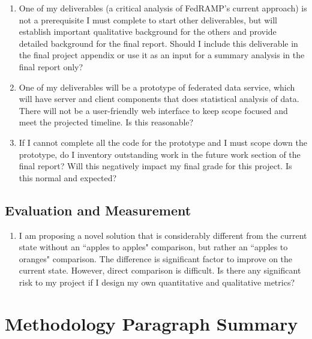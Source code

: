 \documentclass{jdf}
\begin{document}
\begin{enumerate}
    \item One of my deliverables (a critical analysis of FedRAMP's current approach) is not a prerequisite I must complete to start other deliverables, but will establish important qualitative background for the others and provide detailed background for the final report. Should I include this deliverable in the final project appendix or use it as an input for a summary analysis in the final report only?
    \item One of my deliverables will be a prototype of federated data service, which will have server and client components that does statistical analysis of data. There will not be a user-friendly web interface to keep scope focused and meet the projected timeline. Is this reasonable?
    \item If I cannot complete all the code for the prototype and I must scope down the prototype, do I inventory outstanding work in the future work section of the final report? Will this negatively impact my final grade for this project. Is this normal and expected?
\end{enumerate}

\subsection*{Evaluation and Measurement}

\begin{enumerate}
    \item I am proposing a novel solution that is considerably different from the current state without an ``apples to apples" comparison, but rather an ``apples to oranges" comparison. The difference is significant factor to improve on the current state. However, direct comparison is difficult. Is there any significant risk to my project if I design my own quantitative and qualitative metrics?    
\end{enumerate}

\section*{Methodology Paragraph Summary}
\end{document}
